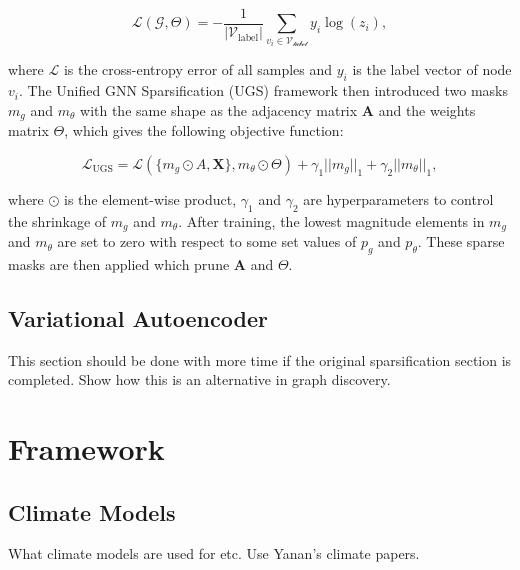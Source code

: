 \documentclass[honours,12pt]{unswthesis}
\numberwithin{equation}{section}
\begin{document}
\begin{equation}
    \mathcal{L}(\mathcal{G}, \Theta) = -\frac{1}{|\mathcal{V}_{\text{label}}|}\sum_{v_i \in \mathcal{V_{\text{label}}}} y_i \log{(z_i)},
\end{equation}

where $\mathcal{L}$ is the cross-entropy error of all samples and $y_i$ is the label vector of node $v_i$. The Unified GNN Sparsification (UGS)
framework then introduced two masks $m_g$ and $m_\theta$ with the same shape as the adjacency matrix $\textbf{A}$ and the weights matrix $\Theta$, which
gives the following objective function:

\begin{equation}
    \mathcal{L}_{\text{UGS}} = \mathcal{L}(\{m_g \odot A, \textbf{X}\}, m_\theta \odot \Theta) + \gamma_1 ||m_g||_1 + \gamma_2 ||m_\theta||_1,
\end{equation}

\noindent where $\odot$ is the element-wise product, $\gamma_1$ and $\gamma_2$ are hyperparameters to control the shrinkage of $m_g$ and $m_\theta$.
After training, the lowest magnitude elements in $m_g$ and $m_\theta$ are set to zero with respect to some set values of $p_g$ and $p_\theta$.
These sparse masks are then applied which prune $\textbf{A}$ and $\Theta$.

\section{Variational Autoencoder}\label{vgae}
This section should be done with more time if the original sparsification section is completed.
Show how this is an alternative in graph discovery.




\chapter{Framework}\label{framework}



\section{Climate Models}\label{climate}
What climate models are used for etc.
Use Yanan's climate papers.
\end{document}
